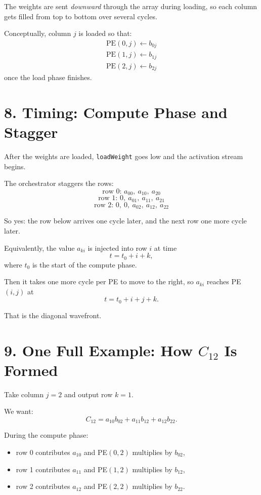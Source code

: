 \documentclass[11pt]{article}
\begin{document}
The weights are sent \emph{downward} through the array during loading, so each column gets filled from top to bottom over several cycles.

Conceptually, column $j$ is loaded so that:
\[
\begin{array}{c}
\text{PE}(0,j) \gets b_{0j} \\
\text{PE}(1,j) \gets b_{1j} \\
\text{PE}(2,j) \gets b_{2j}
\end{array}
\]
once the load phase finishes.

\section*{8. Timing: Compute Phase and Stagger}

After the weights are loaded, \texttt{loadWeight} goes low and the activation stream begins.

The orchestrator staggers the rows:
\[
\text{row 0: } a_{00},\ a_{10},\ a_{20}
\]
\[
\text{row 1: } 0,\ a_{01},\ a_{11},\ a_{21}
\]
\[
\text{row 2: } 0,\ 0,\ a_{02},\ a_{12},\ a_{22}
\]

So yes: the row below arrives one cycle later, and the next row one more cycle later.

Equivalently, the value $a_{ki}$ is injected into row $i$ at time
\[
t = t_0 + i + k,
\]
where $t_0$ is the start of the compute phase.

Then it takes one more cycle per PE to move to the right, so $a_{ki}$ reaches PE$(i,j)$ at
\[
t = t_0 + i + j + k.
\]

That is the diagonal wavefront.

\section*{9. One Full Example: How $C_{12}$ Is Formed}

Take column $j=2$ and output row $k=1$.

We want:
\[
C_{12} = a_{10}b_{02} + a_{11}b_{12} + a_{12}b_{22}.
\]

During the compute phase:
\begin{itemize}
    \item row 0 contributes $a_{10}$ and PE$(0,2)$ multiplies by $b_{02}$,
    \item row 1 contributes $a_{11}$ and PE$(1,2)$ multiplies by $b_{12}$,
    \item row 2 contributes $a_{12}$ and PE$(2,2)$ multiplies by $b_{22}$.
\end{itemize}
\end{document}
